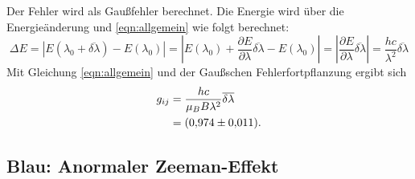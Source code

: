 Der Fehler wird als Gaußfehler berechnet.
Die Energie wird über die Energieänderung und \eqref{eqn:allgemein} wie folgt berechnet:
\begin{equation}
  \Delta E = | E \left( \lambda_{0} + \overline{\delta \lambda} \right) - E \left( \lambda_{0} \right) |
           = \left| E( \lambda_{0}) + \frac{\partial E}{\partial \lambda}\overline{\delta \lambda} - E \left( \lambda_{0} \right) \right|
           = \left| \frac{\partial E}{\partial \lambda}\overline{\delta \lambda} \right|
           = \frac{h c}{ \lambda^2 } \overline{\delta \lambda }
           \label{eqn:energie}
\end{equation}
Mit Gleichung \eqref{eqn:allgemein} und der Gaußschen Fehlerfortpflanzung ergibt sich
\begin{align*}
  g_{ij} &= \frac{h c}{\mu_B B \lambda^2 } \overline{\delta \lambda } \\
          &= \SI{0.974 \pm 0.011}{}.
\end{align*}

\FloatBarrier
\subsection{Blau: Anormaler Zeeman-Effekt}

